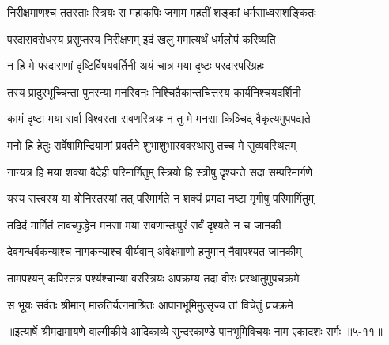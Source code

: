 \twolineshloka
{निरीक्षमाणश्च ततस्ताः स्त्रियः स महाकपिः}
{जगाम महतीं शङ्कां धर्मसाध्वसशङ्कितः} %

\twolineshloka
{परदारावरोधस्य प्रसुप्तस्य निरीक्षणम्}
{इदं खलु ममात्यर्थं धर्मलोपं करिष्यति} %

\twolineshloka
{न हि मे परदाराणां दृष्टिर्विषयवर्तिनी}
{अयं चात्र मया दृष्टः परदारपरिग्रहः} %

\twolineshloka
{तस्य प्रादुरभूच्चिन्ता पुनरन्या मनस्विनः}
{निश्चितैकान्तचित्तस्य कार्यनिश्चयदर्शिनी} %

\twolineshloka
{कामं दृष्टा मया सर्वा विश्वस्ता रावणस्त्रियः}
{न तु मे मनसा किञ्चिद् वैकृत्यमुपपद्यते} %

\twolineshloka
{मनो हि हेतुः सर्वेषामिन्द्रियाणां प्रवर्तने}
{शुभाशुभास्ववस्थासु तच्च मे सुव्यवस्थितम्} %

\twolineshloka
{नान्यत्र हि मया शक्या वैदेही परिमार्गितुम्}
{स्त्रियो हि स्त्रीषु दृश्यन्ते सदा सम्परिमार्गणे} %

\twolineshloka
{यस्य सत्त्वस्य या योनिस्तस्यां तत् परिमार्गते}
{न शक्यं प्रमदा नष्टा मृगीषु परिमार्गितुम्} %

\twolineshloka
{तदिदं मार्गितं तावच्छुद्धेन मनसा मया}
{रावणान्तःपुरं सर्वं दृश्यते न च जानकी} %

\twolineshloka
{देवगन्धर्वकन्याश्च नागकन्याश्च वीर्यवान्}
{अवेक्षमाणो हनुमान् नैवापश्यत जानकीम्} %

\twolineshloka
{तामपश्यन् कपिस्तत्र पश्यंश्चान्या वरस्त्रियः}
{अपक्रम्य तदा वीरः प्रस्थातुमुपचक्रमे} %

\twolineshloka
{स भूयः सर्वतः श्रीमान् मारुतिर्यत्नमाश्रितः}
{आपानभूमिमुत्सृज्य तां विचेतुं प्रचक्रमे} %


॥इत्यार्षे श्रीमद्रामायणे वाल्मीकीये आदिकाव्ये सुन्दरकाण्डे पानभूमिविचयः नाम एकादशः सर्गः ॥५-११॥
